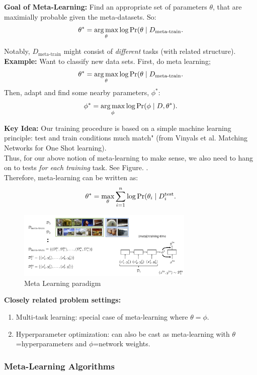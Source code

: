 {\bf Goal of Meta-Learning:} Find an appropriate set of parameters $\theta$, that are maximially probable given the meta-datasets. So:
\[
\theta^* = \operatorname*{arg\,max}_\theta \log \Pr(\theta \mid D_{\text{meta-train}}.
\]

Notably, $D_{\text{meta-train}}$ might consist of {\it different} tasks (with related structure). \\

{\bf Example:} Want to classify new data sets. First, do meta learning;
\[
\theta^* = \operatorname*{arg\,max}_\theta \log \Pr(\theta \mid D_{\text{meta-train}}.
\]
Then, adapt and find some nearby parameters, $\phi^*$:
\[
\phi^* = \operatorname*{arg\,max}_{\phi} \log \Pr(\phi \mid D, \theta^*).
\]


{\bf Key Idea:} Our training procedure is based on a simple machine learning principle: test and train conditions much match" (from Vinyals et al. Matching Networks for One Shot learning). \\

Thus, for our above notion of meta-learning to make sense, we also need to hang on to tests {\it for each training} task. See Figure. . \\

Therefore, meta-learning can be written as:
\[
\theta^* = \max_\theta \sum_{i = 1}^n \log \Pr(\theta_i \mid D_i^{\text{test}}.
\]

\begin{figure}
    \centering
    \includegraphics[width=0.75\textwidth]{images/meta_learn_1.jpg}
    \caption{Meta Learning paradigm}
    \label{fig:meta_learn}
\end{figure}

{\bf Closely related problem settings:}
\begin{enumerate}
\item Multi-task learning: special case of meta-learning where $\theta = \phi$.
\item Hyperparameter optimization: can also be cast as meta-learning with $\theta$=hyperparameters and $\phi$=network weights.
\end{enumerate}

\subsubsection{Meta-Learning Algorithms}

